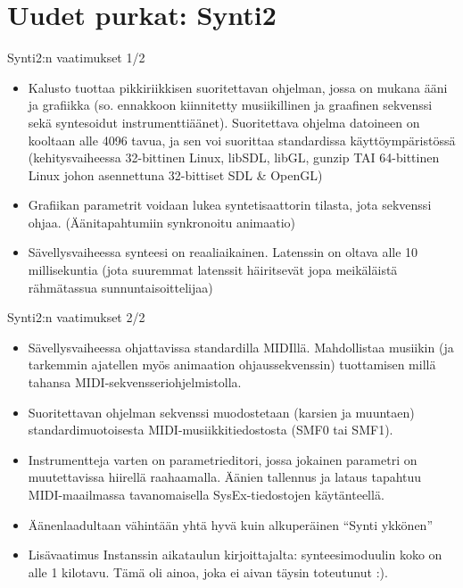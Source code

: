 \documentclass{beamer}
\begin{document}
\section{Uudet purkat: Synti2}
\begin{frame}{Synti2:n vaatimukset 1/2}
\begin{itemize}
\item Kalusto tuottaa pikkiriikkisen suoritettavan ohjelman, jossa on
  mukana ääni ja grafiikka (so. ennakkoon kiinnitetty musiikillinen ja
  graafinen sekvenssi sekä syntesoidut
  instrumenttiäänet). Suoritettava ohjelma datoineen on kooltaan alle
  4096 tavua, ja sen voi suorittaa standardissa käyttöympäristössä
  (kehitysvaiheessa 32-bittinen Linux, libSDL, libGL, gunzip TAI
  64-bittinen Linux johon asennettuna 32-bittiset SDL \& OpenGL)
\item
  Grafiikan parametrit voidaan lukea syntetisaattorin tilasta, jota
  sekvenssi ohjaa. (Äänitapahtumiin synkronoitu animaatio)
\item
  Sävellysvaiheessa synteesi on reaaliaikainen. Latenssin on oltava
  alle 10 millisekuntia (jota suuremmat latenssit häiritsevät jopa
  meikäläistä rähmätassua sunnuntaisoittelijaa)
\end{itemize}
\end{frame}

\begin{frame}{Synti2:n vaatimukset 2/2}
\begin{itemize}
\item Sävellysvaiheessa ohjattavissa standardilla
  MIDIllä. Mahdollistaa musiikin (ja tarkemmin ajatellen myös
  animaation ohjaussekvenssin) tuottamisen millä tahansa
  MIDI-sekvensseriohjelmistolla.
\item Suoritettavan ohjelman sekvenssi muodostetaan (karsien ja
  muuntaen) standardimuotoisesta MIDI-musiikkitiedostosta (SMF0 tai
  SMF1).
\item Instrumentteja varten on parametrieditori, jossa jokainen
  parametri on muutettavissa hiirellä raahaamalla. Äänien tallennus ja
  lataus tapahtuu MIDI-maailmassa tavanomaisella SysEx-tiedostojen
  käytänteellä.
\item Äänenlaadultaan vähintään yhtä hyvä kuin alkuperäinen ``Synti
  ykkönen''
\item Lisävaatimus Instanssin aikataulun kirjoittajalta:
  synteesimoduulin koko on alle 1 kilotavu. Tämä oli ainoa, joka ei
  aivan täysin toteutunut :).
\end{itemize}
\end{frame}
\end{document}

